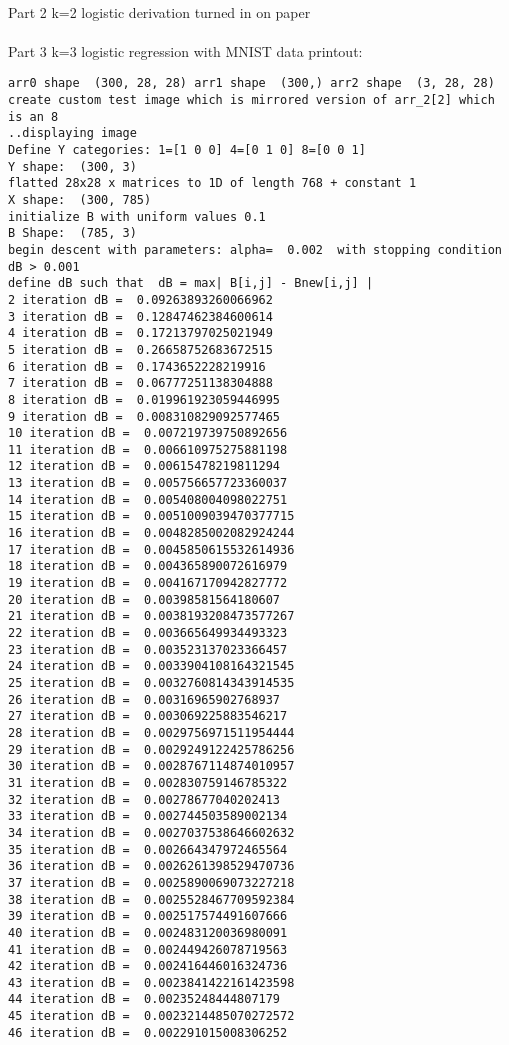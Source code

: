 \documentclass[11pt,a4paper]{article}
\begin{document}
 \quad \quad \\
Part 2 k=2 logistic derivation turned in on paper\\
\quad \quad \\
Part 3 k=3 logistic regression with MNIST data printout:
\scriptsize
\begin{verbatim}
arr0 shape  (300, 28, 28) arr1 shape  (300,) arr2 shape  (3, 28, 28)
create custom test image which is mirrored version of arr_2[2] which is an 8
..displaying image
Define Y categories: 1=[1 0 0] 4=[0 1 0] 8=[0 0 1]
Y shape:  (300, 3)
flatted 28x28 x matrices to 1D of length 768 + constant 1
X shape:  (300, 785)
initialize B with uniform values 0.1
B Shape:  (785, 3)
begin descent with parameters: alpha=  0.002  with stopping condition dB > 0.001
define dB such that  dB = max| B[i,j] - Bnew[i,j] |
2 iteration dB =  0.09263893260066962
3 iteration dB =  0.12847462384600614
4 iteration dB =  0.17213797025021949
5 iteration dB =  0.26658752683672515
6 iteration dB =  0.1743652228219916
7 iteration dB =  0.06777251138304888
8 iteration dB =  0.019961923059446995
9 iteration dB =  0.008310829092577465
10 iteration dB =  0.007219739750892656
11 iteration dB =  0.006610975275881198
12 iteration dB =  0.00615478219811294
13 iteration dB =  0.005756657723360037
14 iteration dB =  0.005408004098022751
15 iteration dB =  0.0051009039470377715
16 iteration dB =  0.0048285002082924244
17 iteration dB =  0.0045850615532614936
18 iteration dB =  0.004365890072616979
19 iteration dB =  0.004167170942827772
20 iteration dB =  0.00398581564180607
21 iteration dB =  0.0038193208473577267
22 iteration dB =  0.003665649934493323
23 iteration dB =  0.003523137023366457
24 iteration dB =  0.0033904108164321545
25 iteration dB =  0.0032760814343914535
26 iteration dB =  0.00316965902768937
27 iteration dB =  0.003069225883546217
28 iteration dB =  0.0029756971511954444
29 iteration dB =  0.0029249122425786256
30 iteration dB =  0.0028767114874010957
31 iteration dB =  0.002830759146785322
32 iteration dB =  0.00278677040202413
33 iteration dB =  0.002744503589002134
34 iteration dB =  0.0027037538646602632
35 iteration dB =  0.002664347972465564
36 iteration dB =  0.0026261398529470736
37 iteration dB =  0.0025890069073227218
38 iteration dB =  0.0025528467709592384
39 iteration dB =  0.002517574491607666
40 iteration dB =  0.002483120036980091
41 iteration dB =  0.002449426078719563
42 iteration dB =  0.002416446016324736
43 iteration dB =  0.0023841422161423598
44 iteration dB =  0.00235248444807179
45 iteration dB =  0.0023214485070272572
46 iteration dB =  0.002291015008306252

\end{verbatim}
\end{document}
